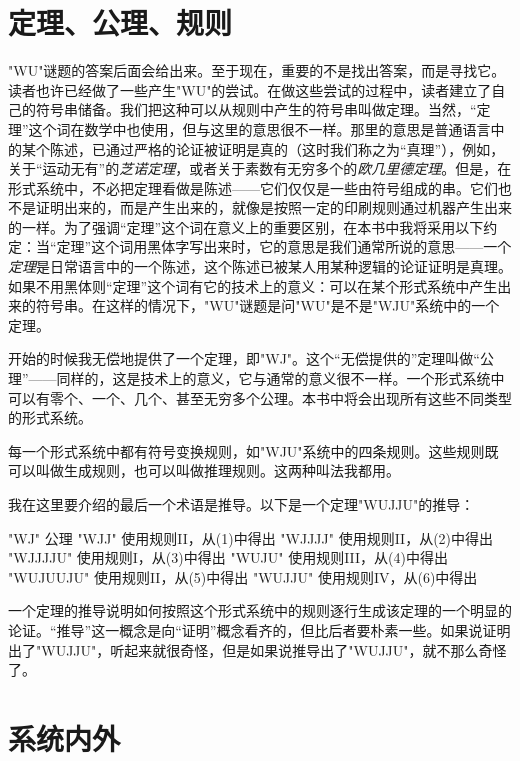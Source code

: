 \section{定理、公理、规则}

"WU"谜题的答案后面会给出来。至于现在，重要的不是找出答案，而是寻找它。读者也许已经做了一些产生"WU"的尝试。在做这些尝试的过程中，读者建立了自己的符号串储备。我们把这种可以从规则中产生的符号串叫做定理。当然，“定理”这个词在数学中也使用，但与这里的意思很不一样。那里的意思是普通语言中的某个陈述，已通过严格的论证被证明是真的（这时我们称之为“真理”），例如，关于“运动无有”的\emph{芝诺定理}，或者关于素数有无穷多个的\emph{欧几里德定理}。但是，在形式系统中，不必把定理看做是陈述——它们仅仅是一些由符号组成的串。它们也不是证明出来的，而是产生出来的，就像是按照一定的印刷规则通过机器产生出来的一样。为了强调“定理”这个词在意义上的重要区别，在本书中我将采用以下约定：当“定理”这个词用黑体字写出来时，它的意思是我们通常所说的意思——一个\emph{定理}是日常语言中的一个陈述，这个陈述已被某人用某种逻辑的论证证明是真理。如果不用黑体则“定理”这个词有它的技术上的意义：可以在某个形式系统中产生出来的符号串。在这样的情况下，"WU"谜题是问"WU"是不是"WJU"系统中的一个定理。

开始的时候我无偿地提供了一个定理，即"WJ"。这个“无偿提供的”定理叫做“公理”——同样的，这是技术上的意义，它与通常的意义很不一样。一个形式系统中可以有零个、一个、几个、甚至无穷多个公理。本书中将会出现所有这些不同类型的形式系统。

每一个形式系统中都有符号变换规则，如"WJU"系统中的四条规则。这些规则既可以叫做生成规则，也可以叫做推理规则。这两种叫法我都用。

我在这里要介绍的最后一个术语是推导。以下是一个定理"WUJJU"的推导：

\begin{enumerate}
\aitem "WJ"      \> 公理
\aitem "WJJ"     \> 使用规则II，从(1)中得出
\aitem "WJJJJ"   \> 使用规则II，从(2)中得出
\aitem "WJJJJU"  \> 使用规则I，从(3)中得出
\aitem "WUJU"    \> 使用规则III，从(4)中得出
\aitem "WUJUUJU" \> 使用规则II，从(5)中得出
\aitem "WUJJU"   \> 使用规则IV，从(6)中得出
\end{enumerate}

一个定理的推导说明如何按照这个形式系统中的规则逐行生成该定理的一个明显的论证。“推导”这一概念是向“证明”概念看齐的，但比后者要朴素一些。如果说证明出了"WUJJU"，听起来就很奇怪，但是如果说推导出了"WUJJU"，就不那么奇怪了。

\section{系统内外}

